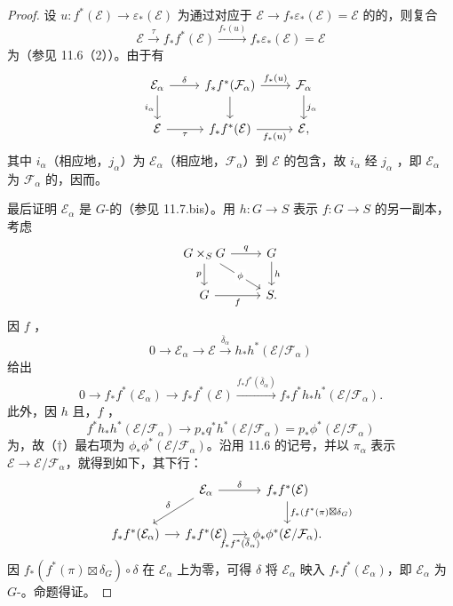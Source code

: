 \begin{proof}
设 $u:f^*(\mathcal E)\to\varepsilon_*(\mathcal E)$ 为通过对应于 $\mathcal E\to f_*\varepsilon_*(\mathcal E)=\mathcal E$ 的的，则复合
\[
\mathcal E\xrightarrow{\tau}f_*f^*(\mathcal E)
\xrightarrow{f_*(u)}f_*\varepsilon_*(\mathcal E)=\mathcal E
\]
为（参见 11.6（2））。由于有
\[
\begin{tikzcd}
\mathcal E_\alpha\arrow[r,"\delta"]\arrow[d,"i_\alpha"']&f_*f^*(\mathcal F_\alpha)\arrow[r,"f_*(u)"]\arrow[d]&\mathcal F_\alpha\arrow[d,"j_\alpha"]\\
\mathcal E\arrow[r,"\tau"']&f_*f^*(\mathcal E)\arrow[r,"f_*(u)"']&\mathcal E,
\end{tikzcd}
\]
其中 $i_\alpha$（相应地，$j_\alpha$）为 $\mathcal E_\alpha$（相应地，$\mathcal F_\alpha$）到 $\mathcal E$ 的包含，故 $i_\alpha$ 经 $j_\alpha$ ，即 $\mathcal E_\alpha$ 为 $\mathcal F_\alpha$ 的，因而。

最后证明 $\mathcal E_\alpha$ 是 $G$-的（参见 11.7.bis）。用 $h:G\to S$ 表示 $f:G\to S$ 的另一副本，考虑
\[
\begin{tikzcd}
G\times_S G\arrow[r,"q"]\arrow[d,"p"']\arrow[dr,"\phi" description]&G\arrow[d,"h"]\\
G\arrow[r,"f"']&S.
\end{tikzcd}
\]
因 $f$ ，
\[
0\longrightarrow\mathcal E_\alpha\longrightarrow\mathcal E
\xrightarrow{\overline\delta_\alpha}h_*h^*(\mathcal E/\mathcal F_\alpha)
\]
给出
\[
0\longrightarrow f_*f^*(\mathcal E_\alpha)\longrightarrow f_*f^*(\mathcal E)
\xrightarrow{f_*f^*(\overline\delta_\alpha)} f_*f^*h_*h^*(\mathcal E/\mathcal F_\alpha).
\tag{$\dagger$}
\]
此外，因 $h$ 且，$f$ ，
\[
f^*h_*h^*(\mathcal E/\mathcal F_\alpha)
\longrightarrow p_*q^*h^*(\mathcal E/\mathcal F_\alpha)=p_*\phi^*(\mathcal E/\mathcal F_\alpha)
\]
为，故（$\dagger$）最右项为 $\phi_*\phi^*(\mathcal E/\mathcal F_\alpha)$。沿用 11.6 的记号，并以 $\pi_\alpha$ 表示 $\mathcal E\to\mathcal E/\mathcal F_\alpha$，就得到如下，其下行：
\[
\begin{tikzcd}[column sep=small]
&\mathcal E_\alpha\arrow[r,"\delta"]\arrow[dl,"\delta"']&f_*f^*(\mathcal E)\arrow[d,"f_*(f^*(\pi)\boxtimes\delta_G)"]\\
f_*f^*(\mathcal E_\alpha)\arrow[r]&f_*f^*(\mathcal E)\arrow[r,"f_*f^*(\overline\delta_\alpha)"']&\phi_*\phi^*(\mathcal E/\mathcal F_\alpha).
\end{tikzcd}
\]
因 $f_*(f^*(\pi)\boxtimes\delta_G)\circ\delta$ 在 $\mathcal E_\alpha$ 上为零，可得 $\delta$ 将 $\mathcal E_\alpha$ 映入 $f_*f^*(\mathcal E_\alpha)$，即 $\mathcal E_\alpha$ 为 $G$-。命题得证。
\end{proof}


